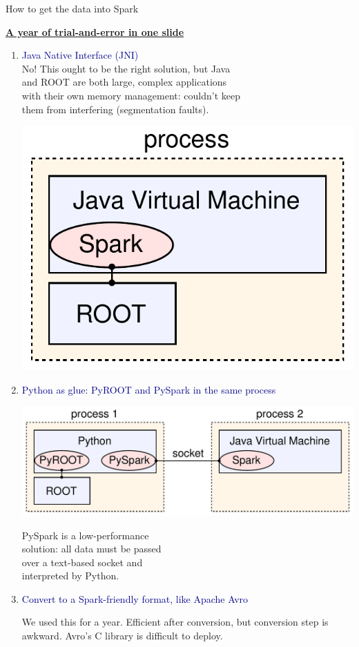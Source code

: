 \documentclass[aspectratio=169]{beamer}
\begin{document}
\begin{frame}{How to get the data into Spark}
\vspace{0.5 cm}
\small

\underline{\large \bf A year of trial-and-error in one slide}
\begin{center}
\begin{minipage}{0.8\linewidth}
\begin{enumerate}
\item \textcolor{darkblue}{Java Native Interface (JNI)} \\ No! This ought to be the right solution, but Java \\ and ROOT are both large, complex applications \\ with their own memory management: couldn't keep \\ them from interfering (segmentation faults).

\vspace{-2.2 cm}
\hfill \includegraphics[height=1.65 cm]{root-spark.pdf}

\vspace{0.5 cm}
\item \textcolor{darkblue}{\normalsize Python as glue: PyROOT and PySpark in the same process}

\hfill \includegraphics[height=1.65 cm]{pyroot-pyspark.pdf}

\vspace{-1.8 cm}
PySpark is a low-performance \\ solution: all data must be passed \\ over a text-based socket and \\ interpreted by Python.

\item \textcolor{darkblue}{\normalsize Convert to a Spark-friendly format, like Apache Avro}

We used this for a year. Efficient after conversion, but conversion step is awkward. Avro's C library is difficult to deploy.
\end{enumerate}
\end{minipage}
\end{center}


\end{frame}
\end{document}
